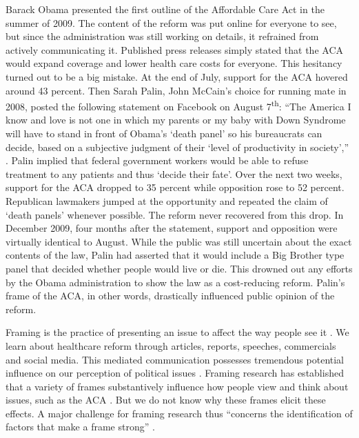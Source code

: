 \documentclass[12pt,]{article}
\begin{document}
Barack Obama presented the first outline of the Affordable Care Act in
the summer of 2009. The content of the reform was put online for
everyone to see, but since the administration was still working on
details, it refrained from actively communicating it. Published press
releases simply stated that the ACA would expand coverage and lower
health care costs for everyone. This hesitancy turned out to be a big
mistake. At the end of July, support for the ACA hovered around 43
percent. Then Sarah Palin, John McCain's choice for running mate in
2008, posted the following statement on Facebook on August
7\textsuperscript{th}: ``The America I know and love is not one in which
my parents or my baby with Down Syndrome will have to stand in front of
Obama's `death panel' so his bureaucrats can decide, based on a
subjective judgment of their `level of productivity in society',''
\citep{palin_statement_2009}. Palin implied that federal government
workers would be able to refuse treatment to any patients and thus
`decide their fate'. Over the next two weeks, support for the ACA
dropped to 35 percent while opposition rose to 52 percent. Republican
lawmakers jumped at the opportunity and repeated the claim of `death
panels' whenever possible. The reform never recovered from this drop. In
December 2009, four months after the statement, support and opposition
were virtually identical to August. While the public was still uncertain
about the exact contents of the law, Palin had asserted that it would
include a Big Brother type panel that decided whether people would live
or die. This drowned out any efforts by the Obama administration to show
the law as a cost-reducing reform. Palin's frame of the ACA, in other
words, drastically influenced public opinion of the reform.

Framing is the practice of presenting an issue to affect the way people
see it
\citep{aaroe_investigating_2011, druckman_evaluating_2001, gross_framing_2008}.
We learn about healthcare reform through articles, reports, speeches,
commercials and social media. This mediated communication possesses
tremendous potential influence on our perception of political issues
\citep{iyengar_framing_1996, kam_risk_2010, tversky_framing_1981}.
Framing research has established that a variety of frames substantively
influence how people view and think about issues, such as the ACA
\citep{price_switching_1997, andsager_how_2000, callaghan_introduction_2005, entman_framing_1993, entman_projections_2004, gamson_media_1989, lahav_ideological_2012, pan_framing_1993, slothuus_political_2010, sniderman_structure_2004, vreese_effects_2004}.
But we do not know why these frames elicit these effects. A major
challenge for framing research thus ``concerns the identification of
factors that make a frame strong'' \citep[p.~116]{chong_framing_2007}.
\end{document}
